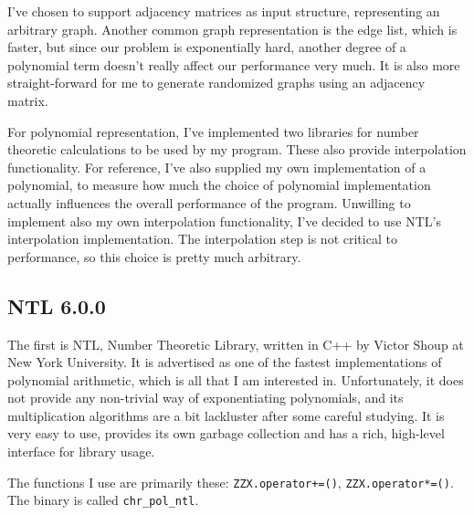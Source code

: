 \documentclass[a4paper]{article}
\newcommand{\code}{\texttt}
\begin{document}
I've chosen to support adjacency matrices as input structure, representing an arbitrary graph\footnotemark. Another common graph representation is the edge list, which is faster, but since our problem is exponentially hard, another degree of a polynomial term doesn't really affect our performance very much. It is also more straight-forward for me to generate randomized graphs using an adjacency matrix.



For polynomial representation, I've implemented two libraries for number theoretic calculations to be used by my program. These also provide interpolation functionality. For reference, I've also supplied my own implementation of a polynomial, to measure how much the choice of polynomial implementation actually influences the overall performance of the program. Unwilling to implement also my own interpolation functionality, I've decided to use NTL's interpolation implementation. The interpolation step is not critical to performance, so this choice is pretty much arbitrary.


\subsection{NTL 6.0.0}
The first is NTL, Number Theoretic Library, written in C++ by Victor Shoup at New York University\cite{ntl}. It is advertised as one of the fastest implementations of polynomial arithmetic, which is all that I am interested in. Unfortunately, it does not provide any non-trivial way of exponentiating polynomials, and its multiplication algorithms are a bit lackluster after some careful studying. It is very easy to use, provides its own garbage collection and has a rich, high-level interface for library usage.

The functions I use are primarily these: \code{ZZX.operator+=()}, \code{ZZX.operator*=()}. The binary is called \code{chr\_pol\_ntl}.
\end{document}
